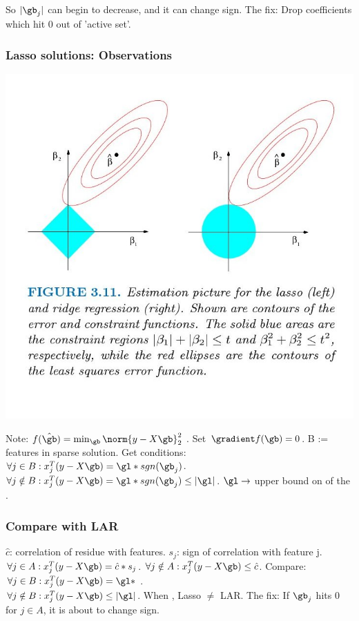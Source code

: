 \documentclass{beamer}
\begin{document}
\begin{frame}
\begin{itemize}
\pitem So $|\gb_{j}|$ can begin to decrease, and it can change sign.
\pitem The  fix: Drop coefficients which hit 0 out of 'active set'.
\end{itemize}
\end{frame}

\begin{frame}
\frametitle{Lasso solutions: Observations}
\includegraphics[scale=0.1]{images/figures3-10.jpg}
\begin{itemize}
\pitem Note: $f(\hat{\gb}) = \min_{\gb} \norm{y-X\gb}_{2}^{2}$ .
\pitem Set $\gradient f(\gb) = 0$.
\pitem B := features in sparse solution.
\pitem Get conditions:
\\ $\forall j\in B: x_{j}^{T}(y-X\gb) = \gl *sgn(\gb_j)$.
\\ $\forall j\notin B: x_{j}^{T}(y-X\gb) = \gl *sgn(\gb_j) \leq |\gl|$.
\pitem {} $\gl \to $ upper bound on  of the .\\
\end{itemize}
\end{frame}

\begin{frame}
\frametitle{Compare with LAR}
\begin{itemize}
\pitem $\hat{c}$: correlation of residue with features. $s_j$: sign of correlation with feature j.
\pitem $\forall j\in A: x_{j}^{T}(y-X\gb) = \hat{c} * s_j$.
\pitem $\forall j\notin A: x_{j}^{T}(y-X\gb) \leq \hat{c}$.
\pitem Compare:
\\ $\forall j\in B: x_{j}^{T}(y-X\gb) = \gl *$ .
\\ $\forall j\notin B: x_{j}^{T}(y-X\gb) \leq |\gl|$.
\pitem When , Lasso $\neq$ LAR.
\pitem The  fix: If $\gb_{j}$ hits 0 for $j \in A$, it is about to change sign.
\end{itemize}
\end{frame}
\end{document}
